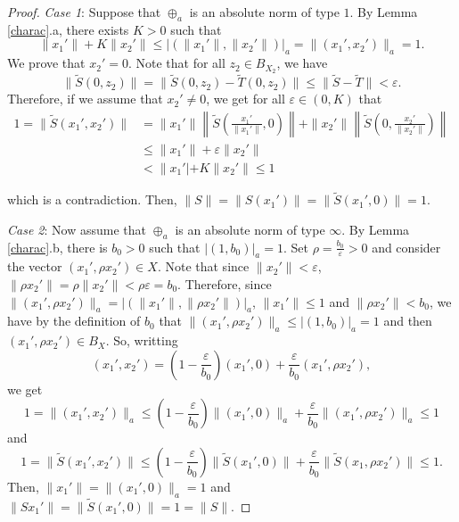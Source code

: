 \documentclass[10pt,a4paper]{amsart}
\theoremstyle{plain}
\theoremstyle{definition}
\newcommand{\eps}{\varepsilon}
\renewcommand{\leq}{\leqslant}
\begin{document}
\begin{proof}
\noindent
{\it Case 1}: Suppose that $\oplus_a$ is an absolute norm of type $1$. By Lemma \ref{charac}.a, there exists $K > 0$ such that
\begin{equation*}
\|x_1'\| + K \| x_2'\| \leq | (\|x_1'\|, \|x_2'\|)|_a = \|(x_1', x_2')\|_a = 1.
\end{equation*}
We prove that $x_2' = 0$. Note that for all $z_2 \in B_{X_2}$, we have
\begin{equation*}
\| \widetilde{S} (0, z_2) \| = \| \widetilde{S} (0, z_2) - \widetilde{T} (0, z_2) \| \leq \| \widetilde{S} - \widetilde{T} \| < \eps.
\end{equation*}
Therefore, if we assume that $x_2' \not= 0$, we get for all $\eps \in (0, K)$ that
\begin{align*}
1 = \| \widetilde{S} (x_1', x_2') \| &= \|x_1'\| \left\| \widetilde{S} \left( \frac{x_1'}{\|x_1'\|}, 0 \right) \right\| + \|x_2'\| \left\| \widetilde{S} \left( 0, \frac{x_2'}{\|x_2'\|} \right) \right\| \\
&\leq \|x_1'\| + \eps \|x_2'\| \\
&< \|x_1'| + K \|x_2'\| \leq 1
\end{align*}

which is a contradiction. Then, $\|S\| = \| S(x_1') \| = \|\widetilde{S} (x_1', 0) \| = 1$.

\noindent
{\it Case 2}: Now assume that $\oplus_a$ is an absolute norm of type $\infty$. By Lemma \ref{charac}.b, there is $b_0 > 0$ such that $|(1, b_0)|_a = 1$. Set $\rho = \frac{b_0}{\eps} > 0$ and consider the vector $(x_1', \rho x_2') \in X$. Note that since $\|x_2'\| < \eps$, $\| \rho x_2'\| = \rho \|x_2'\| < \rho \eps = b_0$. Therefore, since $\|(x_1', \rho x_2')\|_a = | (\|x_1'\|, \| \rho x_2' \|)|_a$, $\|x_1'\| \leq 1$ and $\| \rho x_2'\| < b_0$, we have by the definition of $b_0$ that
$\|(x_1', \rho x_2')\|_a \leq |(1, b_0)|_a = 1$ and then $(x_1', \rho x_2') \in B_X$. So, writting
\begin{equation*}
(x_1', x_2') = \left( 1 - \frac{\eps}{b_0} \right) (x_1', 0) + \frac{\eps}{b_0} (x_1', \rho x_2'),
\end{equation*}
we get
\begin{equation*}
1 = \|(x_1', x_2')\|_a \leq \left( 1 - \frac{\eps}{b_0}\right) \|(x_1', 0)\|_a + \frac{\eps}{b_0} \|(x_1', \rho x_2')\|_a \leq 1
\end{equation*}
and
\begin{equation*}
1 = \|\widetilde{S} (x_1', x_2') \| \leq \left( 1 - \frac{\eps}{b_0} \right) \|\widetilde{S} (x_1', 0) \| + \frac{\eps}{b_0} \| \widetilde{S} (x_1, \rho x_2')\| \leq 1.
\end{equation*}
Then, $\|x_1'\| = \|(x_1', 0)\|_a = 1$ and $\|Sx_1'\| = \|\widetilde{S}(x_1', 0)\| = 1 = \|S\|$.
\end{proof}
\end{document}
